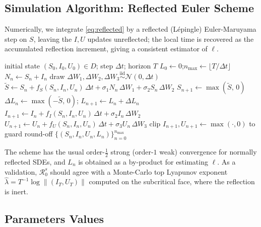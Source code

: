 \documentclass[12pt,a4paper,reqno]{amsart}
\theoremstyle{definition}
\theoremstyle{remark}
\theoremstyle{plain}
\providecommand{\Rzeros}{\mathcal{R}_{0}^{s}}
\begin{document}
\subsection{Simulation Algorithm: Reflected Euler Scheme}
Numerically, we integrate \eqref{eq:reflected} by a reflected (L\'epingle) Euler-Maruyama step on $S$, leaving the $I,U$ updates unreflected; the local time is recovered as the accumulated reflection increment, giving a consistent estimator of $\ell$. %

\begin{algorithm}[t]
\caption{Reflected Euler-Maruyama for the CWD SDE \eqref{eq:reflected}}
\label{alg:reflected-euler}
\begin{algorithmic}[1]
\Require initial state $(S_{0},I_{0},U_{0})\in D$; step $\Delta t$; horizon $T$
\State $L_{0}\gets 0$;\quad $n_{\max}\gets \lfloor T/\Delta t\rfloor$
  \State $N_{n}\gets S_{n}+I_{n}$
  \State draw $\Delta W_{1},\Delta W_{2},\Delta W_{3}\stackrel{\text{iid}}{\sim}\mathcal{N}(0,\Delta t)$
  \State $\tilde S\gets S_{n}+f_{S}(S_{n},I_{n},U_{n})\,\Delta t
          +\sigma_{1}N_{n}\,\Delta W_{1}+\sigma_{2}S_{n}\,\Delta W_{2}$
  \State $S_{n+1}\gets \max(\tilde S,\,0)$
  \State $\Delta L_{n}\gets \max(-\tilde S,\,0)$;\quad
         $L_{n+1}\gets L_{n}+\Delta L_{n}$
  \State $I_{n+1}\gets I_{n}+f_{I}(S_{n},I_{n},U_{n})\,\Delta t
          +\sigma_{2}I_{n}\,\Delta W_{2}$
  \State $U_{n+1}\gets U_{n}+f_{U}(S_{n},I_{n},U_{n})\,\Delta t
          +\sigma_{3}U_{n}\,\Delta W_{3}$
  \State clip $I_{n+1},U_{n+1}\gets\max(\cdot,0)$ to guard round-off
\EndFor
\State \Return $\{(S_{n},I_{n},U_{n},L_{n})\}_{n=0}^{n_{\max}}$
\end{algorithmic}
\end{algorithm}
The scheme has the usual order-$\frac12$ strong (order-$1$ weak) convergence for normally reflected SDEs, and $L_{n}$ is obtained as a by-product for estimating $\ell$. As a validation, $\Rzeros$ should agree with a Monte-Carlo top Lyapunov exponent $\hat\lambda=T^{-1}\log\|(I_{T},U_{T})\|$ computed on the subcritical face, where the reflection is inert.

\subsection{Parameters Values}
\end{document}
